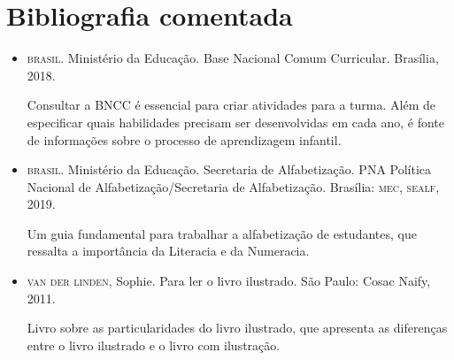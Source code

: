 \documentclass[11pt]{extarticle}
\begin{document}
\section{Bibliografia comentada}

\begin{itemize}
\item \textsc{brasil}. Ministério da Educação. Base Nacional Comum Curricular. Brasília, 2018.

Consultar a \textsc{BNCC} é essencial para criar atividades para a turma. Além de especificar 
quais habilidades precisam ser desenvolvidas em cada ano, é fonte de informações sobre 
o processo de aprendizagem infantil. 
 
\item \textsc{brasil}. Ministério da Educação. Secretaria de Alfabetização. PNA Política Nacional de Alfabetização/Secretaria 
de Alfabetização. Brasília: \textsc{mec, sealf}, 2019.

Um guia fundamental para trabalhar a alfabetização de estudantes, que ressalta a importância da Literacia e da Numeracia. 

\item \textsc{van der linden}, Sophie. Para ler o livro ilustrado. São Paulo: Cosac Naify, 2011.

Livro sobre as particularidades do livro ilustrado, que apresenta as diferenças entre o livro ilustrado e o livro com ilustração. 
\end{itemize}
\end{document}
